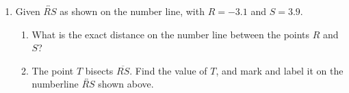 \documentclass[12pt, twoside]{article}
\begin{document}
\begin{enumerate}
\item Given $\overleftrightarrow{RS}$ as shown on the number line, with $R=-3.1$ and $S=3.9$. \\[20pt] %
\begin{enumerate}
  \item What is the exact distance on the number line between the points $R$ and $S$? \vspace{2cm} 
  \item The point $T$ bisects $\overline{RS}$. Find the value of $T$, and mark and label it on the numberline $\overleftrightarrow{RS}$ shown above. 
\end{enumerate} \vspace{2cm} 

  \end{enumerate}
  \newpage
  \setcounter{page}{1}
\end{document}
